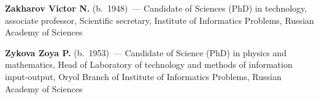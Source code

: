 \begin{multicols}{2}
\noindent
\textbf{Zakharov Victor N.} (b.\ 1948)~--- Candidate of Sciences (PhD)
in technology, associate professor, Scientific secretary,
Institute of Informatics Problems, Russian Academy of Sciences  

\vspace*{7pt}

\noindent
\textbf{Zykova Zoya P.} (b.\ 1953)~--- Candidate of Science (PhD) in physics and mathematics, 
Head of Laboratory of technology and methods of information input-output, Oryol Branch of
 Institute of Informatics Problems,  Russian Academy of Sciences




\thispagestyle{empty}

\end{multicols}